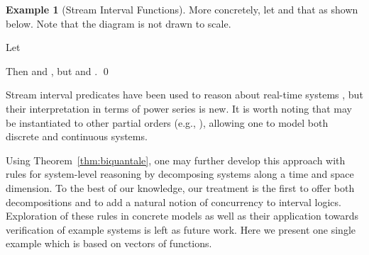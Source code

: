 \documentclass[12pt]{article}
\theoremstyle{definition}
\newtheorem{example}{Example}
\begin{document}
\begin{example}[Stream Interval
  Functions]
  More concretely, let  and that  as shown
  below. Note that the diagram is not drawn to scale. 
  \begin{center}
  \end{center}
  Let
  
  Then  and , but 
  and .  \qed
\end{example}

Stream interval predicates have been used to reason about real-time
systems \cite{DHD14}, but their interpretation in terms of power
series is new.  It is worth noting that  may be instantiated to
other partial orders (e.g., ), allowing one to model both
discrete and continuous systems. 

Using Theorem~\ref{thm:biquantale}, one may further develop this
approach with rules for system-level reasoning by decomposing systems
along a time and space dimension. To the best of our knowledge, our
treatment is the first to offer both decompositions and to add a
natural notion of concurrency to interval logics. Exploration of these
rules in concrete models as well as their application towards
verification of example systems is left as future work. Here we
present one single example which is based on vectors of functions.
\end{document}
